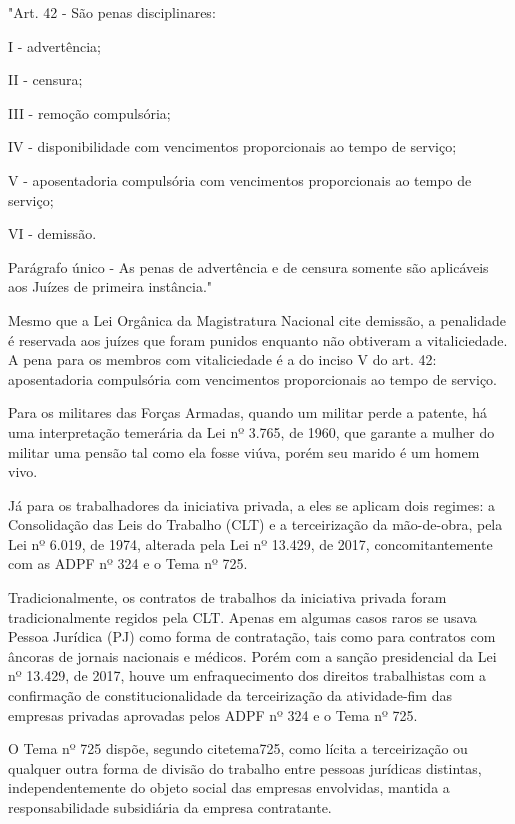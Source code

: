 \noindent
\begin{flushleft}
	\setlength{\leftskip}{4cm}
	\small
	"Art. 42 - São penas disciplinares:
	
	I - advertência;
	
	II - censura;
	
	III - remoção compulsória;
	
	IV - disponibilidade com vencimentos proporcionais ao tempo de serviço;
	
	V - aposentadoria compulsória com vencimentos proporcionais ao tempo de serviço;
	
	VI - demissão.
	
	Parágrafo único - As penas de advertência e de censura somente são aplicáveis aos Juízes de primeira instância." \cite{lcp35}
\end{flushleft}

Mesmo que a Lei Orgânica da Magistratura Nacional cite demissão, a penalidade é reservada aos juízes que foram punidos enquanto não obtiveram a vitaliciedade. A pena para os membros com vitaliciedade é a do inciso V do art. 42: aposentadoria compulsória com vencimentos proporcionais ao tempo de serviço.

Para os militares das Forças Armadas, quando um militar perde a patente, há uma interpretação temerária da Lei nº 3.765, de 1960, que garante a mulher do militar uma pensão tal como ela fosse viúva, porém seu marido é um homem vivo.

Já para os trabalhadores da iniciativa privada, a eles se aplicam dois regimes: a Consolidação das Leis do Trabalho (CLT) e a terceirização da mão-de-obra, pela Lei nº 6.019, de 1974, alterada pela Lei nº 13.429, de 2017, concomitantemente com as ADPF nº 324 e o Tema nº 725.

Tradicionalmente, os contratos de trabalhos da iniciativa privada foram tradicionalmente regidos pela CLT. Apenas em algumas casos raros se usava Pessoa Jurídica (PJ) como forma de contratação, tais como para contratos com âncoras de jornais nacionais e médicos. Porém com a sanção presidencial da Lei nº 13.429, de 2017, houve um enfraquecimento dos direitos trabalhistas com a confirmação de constitucionalidade da terceirização da atividade-fim das empresas privadas aprovadas pelos ADPF nº 324 e o Tema nº 725.

O Tema nº 725 dispõe, segundo cite{tema725}, como lícita a terceirização ou qualquer outra forma de divisão do trabalho entre pessoas jurídicas distintas, independentemente do objeto social das empresas envolvidas, mantida a responsabilidade subsidiária da empresa contratante.

